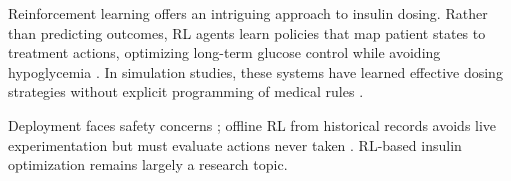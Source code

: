 Reinforcement learning offers an intriguing approach to insulin dosing. Rather than predicting outcomes, RL agents learn policies that map patient states to treatment actions, optimizing long-term glucose control while avoiding hypoglycemia \cite{contreras2018artificial, zhu2021deep}. In simulation studies, these systems have learned effective dosing strategies without explicit programming of medical rules \cite{contreras2018artificial}.

Deployment faces safety concerns \cite{mackenzie2023diabetes}; offline RL from historical records avoids live experimentation but must evaluate actions never taken \cite{contreras2018artificial}. RL-based insulin optimization remains largely a research topic.
